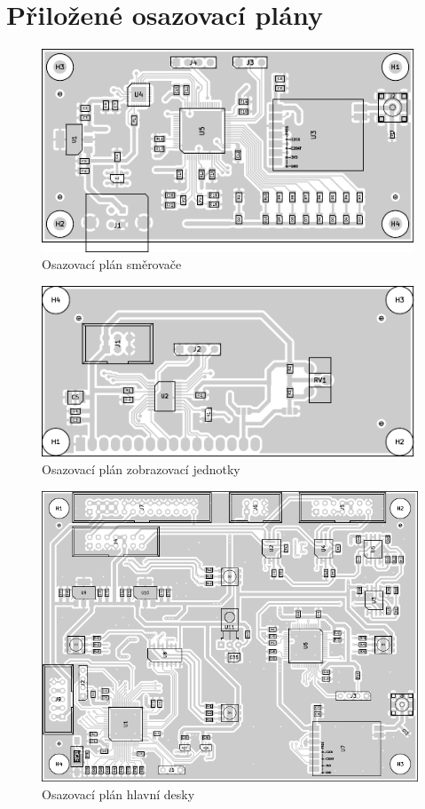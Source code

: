 \chapter{Přiložené osazovací plány}
\begin{figure}[h]
    \centering
    \includegraphics[page=1, width=0.99\textwidth]{pcb/router-placement}
    \caption{Osazovací plán směrovače}
\end{figure}
\begin{figure}[h]
    \centering
    \includegraphics[page=1, width=0.99\textwidth]{pcb/display-placement}
    \caption{Osazovací plán zobrazovací jednotky}
\end{figure}
\begin{figure}[h]
    \centering
    \includegraphics[page=1, width=\textwidth]{pcb/main-placement}
    \caption{Osazovací plán hlavní desky}
\end{figure}
